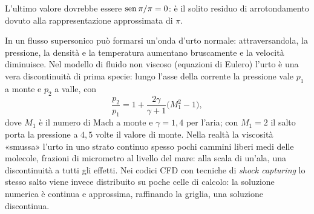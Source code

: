 L'ultimo valore dovrebbe essere $\operatorname{sen}\pi/\pi=0$: è il solito residuo di arrotondamento
dovuto alla rappresentazione approssimata di $\pi$.

\begin{idea}
In un flusso supersonico può formarsi un'onda d'urto normale: attraversandola, la
pressione, la densità e la temperatura aumentano bruscamente e la velocità diminuisce.
Nel modello di fluido non viscoso (equazioni di Eulero) l'urto è una vera discontinuità
di prima specie: lungo l'asse della corrente la pressione vale $p_{1}$ a monte e $p_{2}$
a valle, con
\[
  \frac{p_{2}}{p_{1}}=1+\frac{2\gamma}{\gamma+1}\bigl(M_{1}^{2}-1\bigr),
\]
dove $M_{1}$ è il numero di Mach a monte e $\gamma=1{,}4$ per l'aria; con $M_{1}=2$ il
salto porta la pressione a $4{,}5$ volte il valore di monte. Nella realtà la viscosità
«smussa» l'urto in uno strato continuo spesso pochi cammini liberi medi delle molecole,
frazioni di micrometro al livello del mare: alla scala di un'ala, una discontinuità a
tutti gli effetti. Nei codici CFD con tecniche di \emph{shock capturing} lo stesso salto
viene invece distribuito su poche celle di calcolo: la soluzione numerica è continua e
approssima, raffinando la griglia, una soluzione discontinua.
\end{idea}
